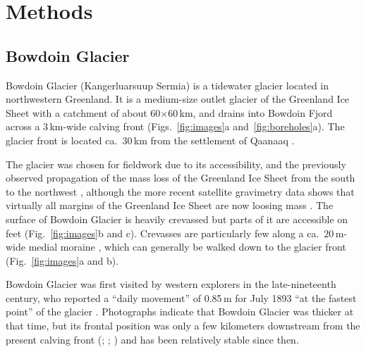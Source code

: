 \documentclass[utf8]{article}
\begin{document}
\section{Methods}

\subsection{Bowdoin Glacier}

    Bowdoin Glacier (Kangerluarsuup Sermia) is a tidewater glacier located in
    northwestern Greenland.
    It is a medium-size outlet glacier of the Greenland Ice Sheet with a
    catchment of about 60$\times$60\,km, and drains into Bowdoin Fjord across a
    3\,km-wide calving front (Figs.~\ref{fig:images}a
    and~\ref{fig:boreholes}a). The glacier front is located ca.~30\,km from
    the settlement of Qaanaaq
    \citep[see Fig.~1 of][for a map]{Sugiyama.etal.2015}.

    The glacier was chosen for fieldwork due to its accessibility, and the
    previously observed propagation of the mass loss of the Greenland Ice Sheet
    from the south to the northwest \citep{Khan.etal.2010}, although the more
    recent satellite gravimetry
    data shows that virtually all margins of the Greenland Ice Sheet are now
    loosing mass \citep{Groh.Horwath.2016}. The surface of Bowdoin Glacier
    is heavily crevassed but parts of it are accessible on feet
    (Fig.~\ref{fig:images}b and c). Crevasses are
    particularly few along a ca.~20\,m-wide medial moraine
    \citep[Fig.~68 of][]{Chamberlin.1897}, which can generally be walked down
    to the glacier front (Fig.~\ref{fig:images}a and b).

    Bowdoin Glacier was first visited by western explorers in the
    late-nineteenth century, who
    reported a ``daily movement'' of 0.85\,m for July 1893 ``at the
    fastest point'' of the glacier \citep{Chamberlin.1894}.
    Photographs indicate that Bowdoin Glacier was thicker at that time, but its
    frontal position was only a few kilometers downstream from the present
    calving front (\citealp[p.~668]{Chamberlin.1895}; \citealp[Figs.~64 and~65
    of][]{Chamberlin.1897}; \citealp[Fig.~1 of][]{Podolskiy.etal.2016}) and has
    been relatively stable since then.
\end{document}
